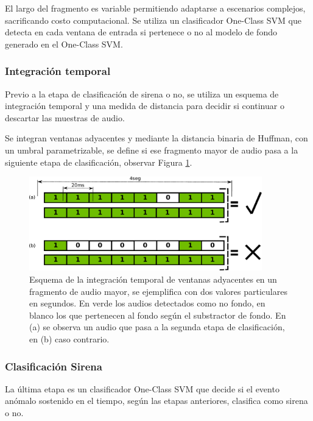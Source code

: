 \documentclass{article}
\begin{document}
El largo del fragmento es variable permitiendo adaptarse a escenarios complejos, sacrificando costo computacional. Se utiliza un clasificador One-Class SVM que detecta en cada ventana de entrada si pertenece o no al modelo de fondo generado en el One-Class SVM.

\subsubsection{Integración temporal}

Previo a la etapa de clasificación de sirena o no, se utiliza un esquema de integración temporal y una medida de distancia para decidir si continuar o descartar las muestras de audio.

\bigskip
Se integran ventanas adyacentes y mediante la distancia binaria de Huffman, con un umbral parametrizable, se define si ese fragmento mayor de audio pasa a la siguiente etapa de clasificación, observar Figura \ref{fig:integracion_temporal}. 

\begin{figure}[h]
\begin{center}
\includegraphics[width=0.9\textwidth]{integracion_temporal} 
\caption{Esquema de la integración temporal de ventanas adyacentes en un fragmento de audio mayor, se ejemplifica con dos valores particulares en segundos. En verde los audios detectados como no fondo, en blanco los que pertenecen al fondo según el substractor de fondo. En (a) se observa un audio que pasa a la segunda etapa de clasificación, en (b) caso contrario.}
\label{fig:integracion_temporal}
\end{center}
\end{figure}
 
\subsubsection{Clasificación Sirena}
La última etapa es un clasificador One-Class SVM que decide si el evento anómalo sostenido en el tiempo, según las etapas anteriores, clasifica como sirena o no. 
\end{document}
